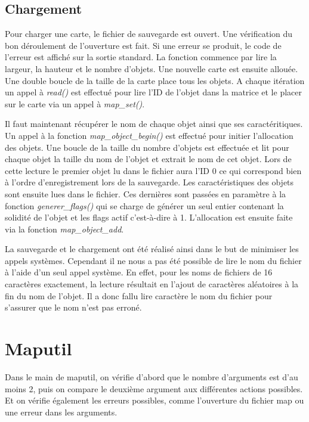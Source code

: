 \documentclass[10pt,a4paper]{article}
\begin{document}
\subsection{Chargement}

	Pour charger une carte, le fichier de sauvegarde est ouvert. Une vérification du bon déroulement de l'ouverture est fait. Si une erreur se produit, le code de l'erreur est affiché sur la sortie standard. La fonction commence par lire la largeur, la hauteur et le nombre d'objets. Une nouvelle carte est ensuite allouée. Une double boucle de la taille de la carte place tous les objets. A chaque itération un appel à \textit{read()} est effectué pour lire l'ID de l'objet dans la matrice et le placer sur le carte via un appel à \textit{map\_set()}.
	
	Il faut maintenant récupérer le nom de chaque objet ainsi que ses caractéritiques. Un appel à la fonction \textit{map\_object\_begin()} est effectué pour initier l'allocation des objets. Une boucle de la taille du nombre d'objets est effectuée et lit pour chaque objet la taille du nom de l'objet et extrait le nom de cet objet. Lors de cette lecture le premier objet lu dans le fichier aura l'ID 0 ce qui correspond bien à l'ordre d'enregistrement lors de la sauvegarde. Les caractéristiques des objets sont ensuite lues dans le fichier. Ces dernières sont passées en paramètre à la fonction \textit{generer\_flags()} qui se charge de générer un seul entier contenant la solidité de l'objet et les flags actif c'est-à-dire à 1. L'allocation est ensuite faite via la fonction \textit{map\_object\_add}.
	
	La sauvegarde et le chargement ont été réalisé ainsi dans le but de minimiser les appels systèmes. Cependant il ne nous a pas été possible de lire le nom du fichier à l'aide d'un seul appel système. En effet, pour les noms de fichiers de 16 caractères exactement, la lecture résultait en l'ajout de caractères aléatoires à la fin du nom de l'objet. Il a donc fallu lire caractère le nom du fichier pour s'assurer que le nom n'est pas erroné. 
	

\section{Maputil}
    Dans le main de maputil, on vérifie d'abord que le nombre d'arguments est d'au moins 2, puis on compare le deuxième argument aux différentes actions possibles. Et on vérifie également les erreurs possibles, comme l'ouverture du fichier map ou une erreur dans les arguments.
\end{document}
